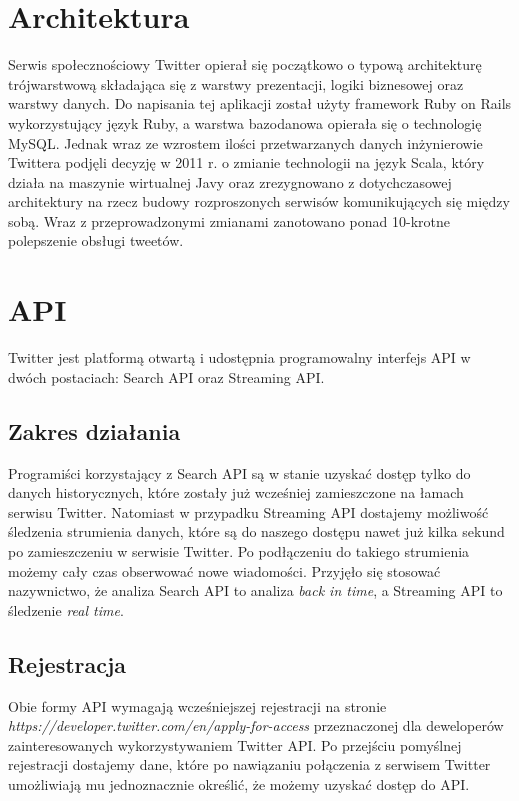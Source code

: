 \section{Architektura}
Serwis społecznościowy Twitter opierał się początkowo o typową architekturę trójwarstwową składająca się z warstwy prezentacji, logiki biznesowej oraz warstwy danych. Do napisania tej aplikacji został użyty framework Ruby on Rails wykorzystujący język Ruby, a warstwa bazodanowa opierała się o technologię MySQL. Jednak wraz ze wzrostem ilości przetwarzanych danych inżynierowie Twittera podjęli decyzję w 2011 r. o zmianie technologii na język Scala, który działa na maszynie wirtualnej Javy oraz zrezygnowano z dotychczasowej architektury na rzecz budowy rozproszonych serwisów komunikujących się między sobą. Wraz z przeprowadzonymi zmianami zanotowano ponad 10-krotne polepszenie obsługi tweetów.

\section{API}
Twitter jest platformą otwartą i udostępnia programowalny interfejs API w dwóch postaciach: Search API oraz Streaming API.

\subsection{Zakres działania}
Programiści korzystający z Search API są w stanie uzyskać dostęp tylko do danych historycznych, które zostały już wcześniej zamieszczone na łamach serwisu Twitter. Natomiast w przypadku Streaming API dostajemy możliwość śledzenia strumienia danych, które są do naszego dostępu nawet już kilka sekund po zamieszczeniu w serwisie Twitter. Po podłączeniu do takiego strumienia możemy cały czas obserwować nowe wiadomości. Przyjęło się stosować nazywnictwo, że analiza Search API to analiza \textit{back in time}, a Streaming API to śledzenie \textit{real time}.

\subsection{Rejestracja}
Obie formy API wymagają wcześniejszej rejestracji na stronie \textit{https://developer.twitter.com/en/apply-for-access} przeznaczonej dla deweloperów zainteresowanych wykorzystywaniem Twitter API. Po przejściu pomyślnej rejestracji dostajemy dane, które po nawiązaniu połączenia z serwisem Twitter umożliwiają mu jednoznacznie określić, że możemy uzyskać dostęp do API.

